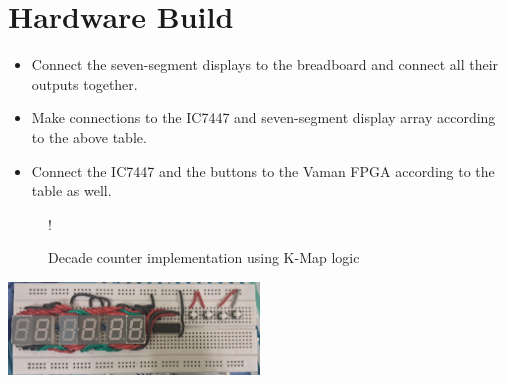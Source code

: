 \section{Hardware Build}
\begin{itemize}
    \item Connect the seven-segment displays to the breadboard and connect all their outputs together.
    \item Make connections to the IC7447 and seven-segment display array according to the above table.
    \item Connect the IC7447 and the buttons to the Vaman FPGA according to the table as well.
\end{itemize}

\begin{figure}[ht]
\centering
{} {!} {

}
\caption{Decade counter implementation using K-Map logic}
\label{fig:decade_counter}
\end{figure}

\includegraphics[width=0.5\textwidth]{figs/clock.jpeg}
